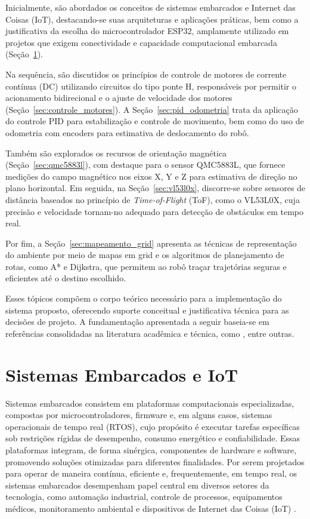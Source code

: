 \documentclass[	12pt, Times, openright, twoside, a4paper, english, brazil]{abntex2}
\begin{document}
Inicialmente, são abordados os conceitos de sistemas embarcados e Internet das Coisas (IoT), destacando-se suas arquiteturas e aplicações práticas, bem como a justificativa da escolha do microcontrolador ESP32, amplamente utilizado em projetos que exigem conectividade e capacidade computacional embarcada (Seção~\ref{sec:sistemas_emb}).

Na sequência, são discutidos os princípios de controle de motores de corrente contínua (DC) utilizando circuitos do tipo ponte H, responsáveis por permitir o acionamento bidirecional e o ajuste de velocidade dos motores (Seção~\ref{sec:controle_motores}). A Seção~\ref{sec:pid_odometria} trata da aplicação do controle PID para estabilização e controle de movimento, bem como do uso de odometria com encoders para estimativa de deslocamento do robô.

Também são explorados os recursos de orientação magnética (Seção~\ref{sec:qmc5883l}), com destaque para o sensor QMC5883L, que fornece medições do campo magnético nos eixos X, Y e Z para estimativa de direção no plano horizontal. Em seguida, na Seção~\ref{sec:vl53l0x}, discorre-se sobre sensores de distância baseados no princípio de \textit{Time-of-Flight} (ToF), como o VL53L0X, cuja precisão e velocidade tornam-no adequado para detecção de obstáculos em tempo real.

Por fim, a Seção~\ref{sec:mapeamento_grid} apresenta as técnicas de representação do ambiente por meio de mapas em grid e os algoritmos de planejamento de rotas, como A* e Dijkstra, que permitem ao robô traçar trajetórias seguras e eficientes até o destino escolhido.

Esses tópicos compõem o corpo teórico necessário para a implementação do sistema proposto, oferecendo suporte conceitual e justificativa técnica para as decisões de projeto. A fundamentação apresentada a seguir baseia-se em referências consolidadas na literatura acadêmica e técnica, como , entre outras.

\section{Sistemas Embarcados e IoT} \label{sec:sistemas_emb}

Sistemas embarcados consistem em plataformas computacionais especializadas, compostas por microcontroladores, firmware e, em alguns casos, sistemas operacionais de tempo real (RTOS), cujo propósito é executar tarefas específicas sob restrições rígidas de desempenho, consumo energético e confiabilidade. Essas plataformas integram, de forma sinérgica, componentes de hardware e software, promovendo soluções otimizadas para diferentes finalidades. Por serem projetados para operar de maneira contínua, eficiente e, frequentemente, em tempo real, os sistemas embarcados desempenham papel central em diversos setores da tecnologia, como automação industrial, controle de processos, equipamentos médicos, monitoramento ambiental e dispositivos de Internet das Coisas (IoT) \cite{matiz2024sistemas}.
\end{document}
